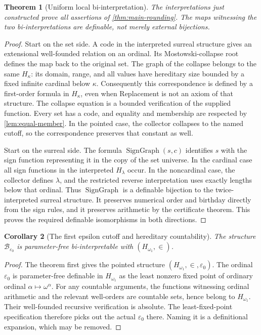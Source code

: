 \documentclass[11pt,letterpaper]{article}
\newtheorem{theorem}{Theorem}[section]
\newtheorem{corollary}[theorem]{Corollary}
\theoremstyle{definition}
\theoremstyle{remark}
\newcommand{\B}{\mathcal B}
\newcommand{\SG}{\operatorname{SignGraph}}
\begin{document}
\begin{theorem}[Uniform local bi-interpretation]
\label{thm:biinterpretation}
The interpretations just constructed prove all assertions of
\cref{thm:main-rounding}. The maps witnessing the two bi-interpretations are
definable, not merely external bijections.
\end{theorem}
\begin{proof}
Start on the set side. A code in the interpreted surreal structure gives
an extensional well-founded relation on an ordinal. Its Mostowski-collapse
root defines the map back to the original set. The graph of the collapse
belongs to the same $H_\kappa$: its domain, range, and all values have
hereditary size bounded by a fixed infinite cardinal below $\kappa$.
Consequently this correspondence is defined by a first-order formula in
$H_\kappa$, even when Replacement is not an axiom of that structure.
The collapse equation is a bounded verification of the supplied function.
Every set has a code, and equality and membership are respected by
\cref{lem:equal-member}. In the pointed case, the collector collapses to the
named cutoff, so the correspondence preserves that constant as well.

Start on the surreal side. The formula $\SG(s,c)$ identifies $s$ with the
sign function representing it in the copy of the set universe. In the
cardinal case all sign functions in the interpreted $H_\lambda$ occur.
In the noncardinal case, the collector defines $\lambda$, and the restricted
reverse interpretation uses exactly lengths below that ordinal. Thus $\SG$
is a definable bijection to the twice-interpreted surreal structure.
It preserves numerical order and birthday directly from the sign rules,
and it preserves arithmetic by the certificate theorem. This proves the
required definable isomorphisms in both directions.
\end{proof}

\begin{corollary}[The first epsilon cutoff and hereditary countability]
\label{cor:epsilon0}
The structure $\B_{\varepsilon_0}$ is parameter-free bi-interpretable with
$(H_{\omega_1},\in)$.
\end{corollary}
\begin{proof}
The theorem first gives the pointed structure
$(H_{\omega_1},\in,\varepsilon_0)$. The ordinal $\varepsilon_0$ is
parameter-free definable in $H_{\omega_1}$ as the least nonzero fixed point
of ordinary ordinal $\alpha\mapsto\omega^\alpha$. For any countable
arguments, the functions witnessing ordinal arithmetic and the relevant
well-orders are countable sets, hence belong to $H_{\omega_1}$. Their
well-founded recursive verification is absolute. The least-fixed-point
specification therefore picks out the actual $\varepsilon_0$ there.
Naming it is a definitional expansion, which may be removed.
\end{proof}
\end{document}
